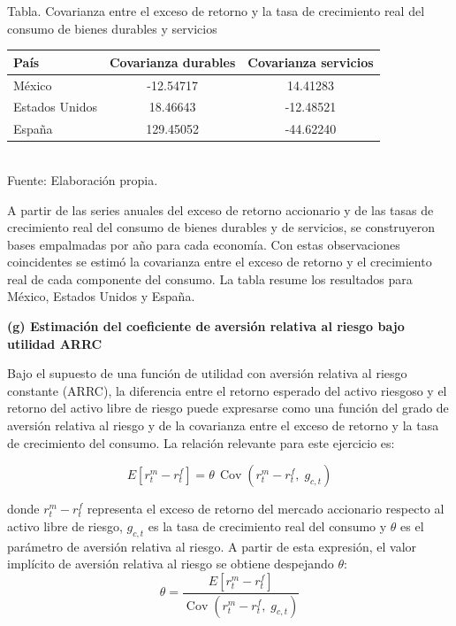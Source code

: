 \documentclass{article}\usepackage[]{graphicx}\usepackage[]{xcolor}
\begin{document}
\begin{center}
Tabla. Covarianza entre el exceso de retorno y la tasa de crecimiento real del consumo de bienes durables y servicios
\end{center}
\begin{center}

\begin{tabular}{lcc}
\toprule
País & Covarianza durables & Covarianza servicios\\
\midrule
México & -12.54717 & 14.41283\\
Estados Unidos & 18.46643 & -12.48521\\
España & 129.45052 & -44.62240\\
\bottomrule
\end{tabular}
\\[0.3em]
{\footnotesize Fuente: Elaboración propia.}
\end{center}


A partir de las series anuales del exceso de retorno accionario y de las tasas de crecimiento real del consumo de bienes durables y de servicios, se construyeron bases empalmadas por año para cada economía. Con estas observaciones coincidentes se estimó la covarianza entre el exceso de retorno y el crecimiento real de cada componente del consumo. La tabla resume los resultados para México, Estados Unidos y España.

\newpage
\textbf{(g) Estimación del coeficiente de aversión relativa al riesgo bajo utilidad ARRC}

Bajo el supuesto de una función de utilidad con aversión relativa al riesgo constante (ARRC), la diferencia entre el retorno esperado del activo riesgoso y el retorno del activo libre de riesgo puede expresarse como una función del grado de aversión relativa al riesgo y de la covarianza entre el exceso de retorno y la tasa de crecimiento del consumo. La relación relevante para este ejercicio es:

\[
E[r^m_t - r^f_t] = \theta \, \operatorname{Cov}(r^m_t - r^f_t,\; g_{c,t})
\]

donde \(r^m_t - r^f_t\) representa el exceso de retorno del mercado accionario respecto al activo libre de riesgo, \(g_{c,t}\) es la tasa de crecimiento real del consumo y \(\theta\) es el parámetro de aversión relativa al riesgo. A partir de esta expresión, el valor implícito de aversión relativa al riesgo se obtiene despejando \(\theta\):
\[
\theta = \frac{E[r^m_t - r^f_t]}{\operatorname{Cov}(r^m_t - r^f_t,\; g_{c,t})}
\]
\end{document}
